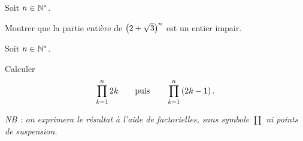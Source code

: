 \begin{exo}
Soit \(n\in\mathbb{N}^*\).

Montrer que la partie entière de \(\left(2+\sqrt{3}\right)^n\) est un entier impair.
\end{exo}

\begin{corr}
\end{corr}

\begin{exo}[Classique]
Soit \(n\in\mathbb{N}^*\).

Calculer \[\prod_{k=1}^{n}2k\qquad\text{puis}\qquad\prod_{k=1}^{n}\left(2k-1\right).\]

\textit{NB : on exprimera le résultat à l'aide de factorielles, sans symbole \(\prod\) ni points de suspension.}
\end{exo}

\begin{corr}
\end{corr}